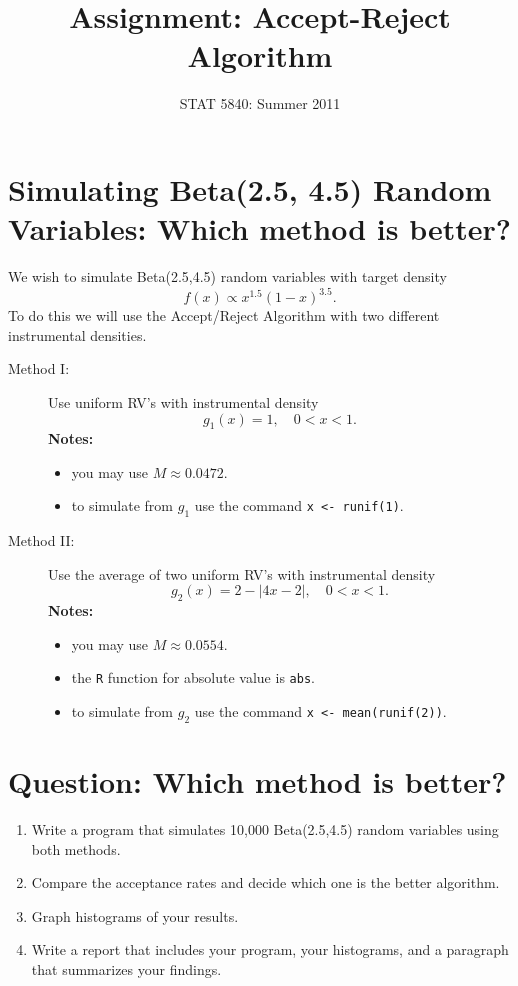 \documentclass[11pt,english]{article}
\title{Assignment: Accept-Reject Algorithm}
\date{STAT 5840: Summer 2011}
\begin{document}
\maketitle

\thispagestyle{empty}

\section*{Simulating Beta(2.5, 4.5) Random Variables: Which method is better?}
\label{sec-1}

We wish to simulate Beta(2.5,4.5) random variables with target density
\[
f(x) \propto x^{1.5}(1-x)^{3.5}.
\]
To do this we will use the Accept/Reject Algorithm with two different instrumental densities.


\begin{description}
\item[Method I:] Use uniform RV’s with instrumental density
   \[
   g_{1}(x) = 1,\quad 0 < x < 1.
   \]
   \textbf{Notes:}
\begin{itemize}
\item you may use \(M \approx 0.0472\).
\item to simulate from \(g_{1}\) use the command \texttt{x <- runif(1)}.
\end{itemize}
\item[Method II:] Use the average of two uniform RV’s with instrumental density
   \[
   g_{2}(x) = 2 - |4x - 2|,\quad 0 < x <1.
   \]
   \textbf{Notes:}
\begin{itemize}
\item you may use \(M \approx 0.0554\).
\item the \texttt{R} function for absolute value is \texttt{abs}.
\item to simulate from \(g_{2}\) use the command \texttt{x <- mean(runif(2))}.
\end{itemize}
\end{description}
\section*{Question: Which method is better?}
\label{sec-2}


\begin{enumerate}
\item Write a program that simulates 10,000 Beta(2.5,4.5) random variables using both methods.
\item Compare the acceptance rates and decide which one is the better algorithm.
\item Graph histograms of your results.
\item Write a report that includes your program, your histograms, and a paragraph that summarizes your findings.
\end{enumerate}
\end{document}
